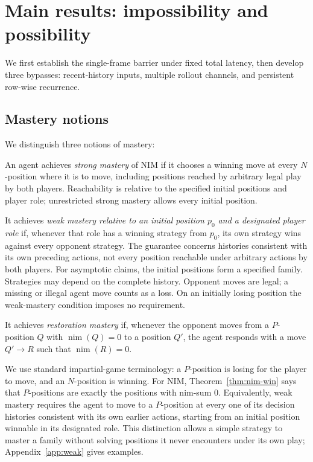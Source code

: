 \documentclass[twoside,11pt]{article}
\numberwithin{theorem}{section}
\numberwithin{equation}{section}
\begin{document}
\section{Main results: impossibility and possibility}
\label{sec:main}

We first establish the single-frame barrier under fixed total latency, then develop three bypasses: recent-history inputs, multiple rollout channels, and persistent row-wise recurrence.

\subsection{Mastery notions}
We distinguish three notions of mastery:

\begin{definition}
\label{def:mastery}
An agent achieves \emph{strong mastery} of NIM if it chooses a winning move at every $N$-position where it is to move, including positions reached by arbitrary legal play by both players. Reachability is relative to the specified initial positions and player role; unrestricted strong mastery allows every initial position.

It achieves \emph{weak mastery relative to an initial position $p_0$ and a designated player role} if, whenever that role has a winning strategy from $p_0$, its own strategy wins against every opponent strategy. The guarantee concerns histories consistent with its own preceding actions, not every position reachable under arbitrary actions by both players. For asymptotic claims, the initial positions form a specified family. Strategies may depend on the complete history. Opponent moves are legal; a missing or illegal agent move counts as a loss. On an initially losing position the weak-mastery condition imposes no requirement.

It achieves \emph{restoration mastery} if, whenever the opponent moves from a $P$-position $Q$ with $\operatorname{nim}(Q)=0$ to a position $Q'$, the agent responds with a move $Q'\to R$ such that $\operatorname{nim}(R)=0$.
\end{definition}

We use standard impartial-game terminology: a $P$-position is losing for the player to move, and an $N$-position is winning.
For NIM, Theorem~\ref{thm:nim-win} says that $P$-positions are exactly the positions with nim-sum $0$. Equivalently, weak mastery requires the agent to move to a $P$-position at every one of its decision histories consistent with its own earlier actions, starting from an initial position winnable in its designated role. This distinction allows a simple strategy to master a family without solving positions it never encounters under its own play; Appendix~\ref{app:weak} gives examples.
\end{document}
